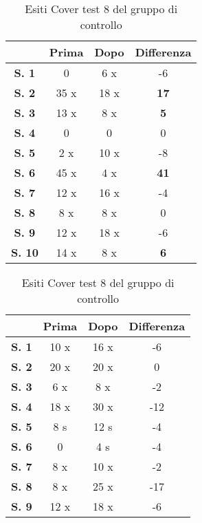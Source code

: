 \\\ \\\ \\\ \\\ \\\ \\\ \\\ 
\begin{table}[H]
\centering
\setlength\tabcolsep{4pt}
\begin{minipage}{0.48\textwidth}
\centering

\begin{tabular}{|c|c|c|c|} \hline
{\textbf{}} & {\textbf{Prima}} & {\textbf{Dopo}}& {\textbf{Differenza}} \\ \hline
\textbf{S. 1} & 0 & 6 x & -6 \\ \hline
\textbf{S. 2} & 35 x & 18 x & \textbf{17} \\ \hline
\textbf{S. 3} & 13 x & 8 x & \textbf{5} \\ \hline
\textbf{S. 4} & 0 & 0 & 0 \\ \hline
\textbf{S. 5} & 2 x & 10 x & -8 \\ \hline
\textbf{S. 6} & 45 x & 4 x & \textbf{41} \\ \hline
\textbf{S. 7} & 12 x & 16 x & -4 \\ \hline
\textbf{S. 8} & 8 x & 8 x & 0 \\ \hline
\textbf{S. 9} & 12 x & 18 x & -6 \\ \hline
\textbf{S. 10} & 14 x & 8 x & \textbf{6} \\ \hline
\end{tabular} 
\caption{Esiti Cover test 8 del gruppo sperimentale}

\label{tab:accuracy} 
\end{minipage}%
\hfill
\begin{minipage}{0.48\textwidth}
\centering

\begin{tabular}{|c|c|c|c|} \hline
{\textbf{}} & {\textbf{Prima}} & {\textbf{Dopo}}& {\textbf{Differenza}} \\ \hline
\textbf{S. 1} & 10 x & 16 x & -6 \\ \hline
\textbf{S. 2} & 20 x & 20 x & 0 \\ \hline
\textbf{S. 3} & 6 x & 8 x & -2 \\ \hline
\textbf{S. 4} & 18 x & 30 x & -12 \\ \hline
\textbf{S. 5} & 8 s & 12 s & -4 \\ \hline
\textbf{S. 6} & 0  & 4 s & -4 \\ \hline
\textbf{S. 7} & 8 x & 10 x & -2 \\ \hline
\textbf{S. 8} & 8 x & 25 x & -17 \\ \hline
\textbf{S. 9} & 12 x & 18 x & -6 \\ \hline
\end{tabular} 
\caption{Esiti Cover test 8 del gruppo di controllo}

 \label{tab:ompdiff} 
\end{minipage}
\end{table}
